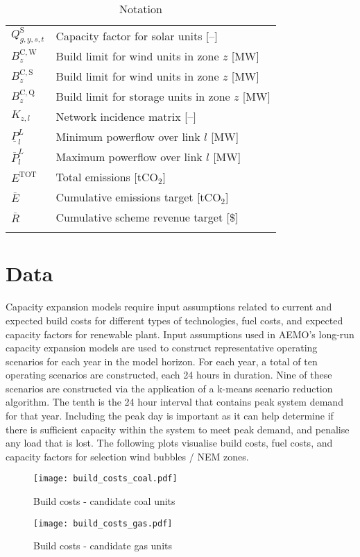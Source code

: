 \documentclass{article}
\newcommand{\iGenerator}{g}
\newcommand{\iYear}{y}
\newcommand{\iScenario}{s}
\newcommand{\iInterval}{t}
\newcommand{\iZone}{z}
\newcommand{\iLink}{l}
\newcommand{\cBuildLimitWind}{B^{\mathrm{C,\mathrm{W}}}_{\iZone}}
\newcommand{\cBuildLimitSolar}{B^{\mathrm{C,\mathrm{S}}}_{\iZone}}
\newcommand{\cBuildLimitStorage}{B^{\mathrm{C,\mathrm{Q}}}_{\iZone}}
\newcommand{\cCapacityFactorSolar}[1][\iGenerator,\iYear,\iScenario,\iInterval]{Q_{#1}^{\mathrm{S}}}
\newcommand{\cIncidenceMatrix}[1][\iZone,\iLink]{K_{#1}}
\newcommand{\cPowerFlowMin}{\underline{P}_{\iLink}^{L}}
\newcommand{\cPowerFlowMax}{\overline{P}_{\iLink}^{L}}
\newcommand{\cEmmissionsCumulativeTarget}{\overline{E}}
\newcommand{\cSchemeRevenueCumulativeTarget}{\overline{R}}
\newcommand{\cEmissionsTotal}{E^{\mathrm{TOT}}}
\begin{document}
\begin{longtable}{ p{}  p{}}
	$\cCapacityFactorSolar$ & Capacity factor for solar units [--]\\
	$\cBuildLimitWind$ & Build limit for wind units in zone $\iZone$ [MW]\\
	$\cBuildLimitSolar$ & Build limit for wind units in zone $\iZone$ [MW]\\
	$\cBuildLimitStorage$ & Build limit for storage units in zone $\iZone$ [MW]\\
	$\cIncidenceMatrix$ & Network incidence matrix [--]\\
	$\cPowerFlowMin$ & Minimum powerflow over link $\iLink$ [MW]\\
	$\cPowerFlowMax$ & Maximum powerflow over link $\iLink$ [MW]\\
	$\cEmissionsTotal$ & Total emissions [tCO$_{2}$]\\
	$\cEmmissionsCumulativeTarget$ & Cumulative emissions target [tCO$_{2}$]\\
	$\cSchemeRevenueCumulativeTarget$ & Cumulative scheme revenue target [\$]\\
	\hline
	\caption{Notation}
\end{longtable}

\section{Data}
Capacity expansion models require input assumptions related to current and expected build costs for different types of technologies, fuel costs, and expected capacity factors for renewable plant. Input assumptions used in AEMO's long-run capacity expansion models are used to construct representative operating scenarios for each year in the model horizon. For each year, a total of ten operating scenarios are constructed, each 24 hours in duration. Nine of these scenarios are constructed via the application of a k-means scenario reduction algorithm. The tenth is the 24 hour interval that contains peak system demand for that year. Including the peak day is important as it can help determine if there is sufficient capacity within the system to meet peak demand, and penalise any load that is lost. The following plots visualise build costs, fuel costs, and capacity factors for selection wind bubbles / NEM zones.


\begin{figure}
	\texttt{[image: build\_costs\_coal.pdf]}
	\caption{Build costs - candidate coal units}
\end{figure}

\begin{figure}
	\texttt{[image: build\_costs\_gas.pdf]}
	\caption{Build costs - candidate gas units}
\end{figure}
\end{document}
